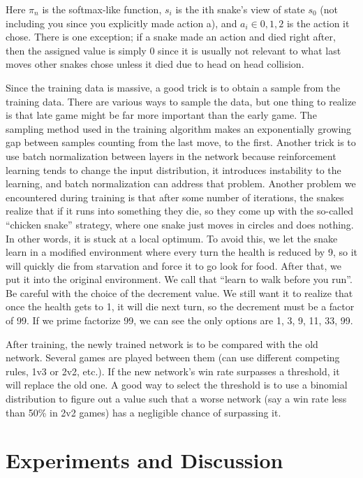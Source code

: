 \documentclass{article}
\begin{document}
Here $\pi_n$ is the softmax-like function, $s_i$ is the ith snake’s view of
state $s_0$ (not including you since you explicitly made action a), and $a_i
  \in {0,1,2}$ is the action it chose. There is one exception; if a snake made
an action and died right after, then the assigned value is simply 0 since it
is usually not relevant to what last moves other snakes chose unless it died
due to head on head collision.

Since the training data is massive, a good trick is to obtain a sample from the
training data. There are various ways to sample the data, but one thing to
realize is that late game might be far more important than the early game. The
sampling method used in the training algorithm makes an exponentially growing
gap between samples counting from the last move, to the first. Another trick
is to use batch normalization between layers in the network because
reinforcement learning tends to change the input distribution, it introduces
instability to the learning, and batch normalization can address that problem.
Another problem we encountered during training is that after some number of
iterations, the snakes realize that if it runs into something they die, so they
come up with the so-called “chicken snake” strategy, where one snake just
moves in circles and does nothing. In other words, it is stuck at a local optimum.
To avoid this, we let the snake learn in a modified environment where every turn
the health is reduced by 9, so it will quickly die from starvation and force it
to go look for food. After that, we put it into the original environment. We
call that “learn to walk before you run”. Be careful with the choice of the
decrement value. We still want it to realize that once the health gets to 1, it
will die next turn, so the decrement must be a factor of 99. If we prime
factorize 99, we can see the only options are 1, 3, 9, 11, 33, 99.

After training, the newly trained network is to be compared with the old network.
Several games are played between them (can use different competing rules,
1v3 or 2v2, etc.). If the new network’s win rate surpasses a threshold, it will
replace the old one. A good way to select the threshold is to use a binomial
distribution to figure out a value such that a worse network (say a win rate
less than 50\% in 2v2 games) has a negligible chance of surpassing it.


\section{Experiments and Discussion}
\end{document}
